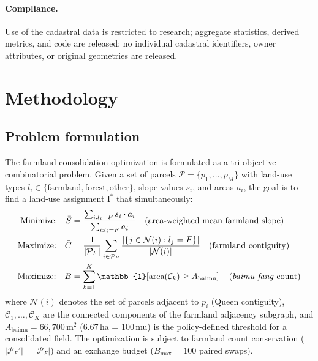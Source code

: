 \documentclass[preprint,12pt]{elsarticle}
\begin{document}
\paragraph{Compliance.} Use of the cadastral data is restricted to research; aggregate statistics, derived metrics, and code are released; no individual cadastral identifiers, owner attributes, or original geometries are released.


\section{Methodology}
\label{sec:methods}

\subsection{Problem formulation}
\label{sec:problem}

The farmland consolidation optimization is formulated as a tri-objective combinatorial problem. Given a set of parcels $\mathcal{P} = \{p_1, \ldots, p_M\}$ with land-use types $l_i \in \{\text{farmland}, \text{forest}, \text{other}\}$, slope values $s_i$, and areas $a_i$, the goal is to find a land-use assignment $\mathbf{l}^*$ that simultaneously:
\begin{align}
\text{Minimize:} \quad \bar{S} &= \frac{\sum_{i: l_i = F} s_i \cdot a_i}{\sum_{i: l_i = F} a_i} \quad \text{(area-weighted mean farmland slope)} \label{eq:slope} \\
\text{Maximize:} \quad \bar{C} &= \frac{1}{|\mathcal{P}_F|} \sum_{i \in \mathcal{P}_F} \frac{|\{j \in \mathcal{N}(i): l_j = F\}|}{|\mathcal{N}(i)|} \quad \text{(farmland contiguity)} \label{eq:cont} \\
\text{Maximize:} \quad B &= \sum_{k=1}^{K} \mathbb{1}\!\left[\text{area}(\mathcal{C}_k) \geq A_{\text{baimu}}\right] \quad \text{(\textit{baimu fang} count)} \label{eq:baimu}
\end{align}
where $\mathcal{N}(i)$ denotes the set of parcels adjacent to $p_i$ (Queen contiguity), $\mathcal{C}_1, \ldots, \mathcal{C}_K$ are the connected components of the farmland adjacency subgraph, and $A_{\text{baimu}} = 66{,}700$\,m$^2$ (6.67\,ha = 100\,mu) is the policy-defined threshold for a consolidated field. The optimization is subject to farmland count conservation ($|\mathcal{P}_F'| = |\mathcal{P}_F|$) and an exchange budget ($B_{\max} = 100$ paired swaps).
\end{document}
